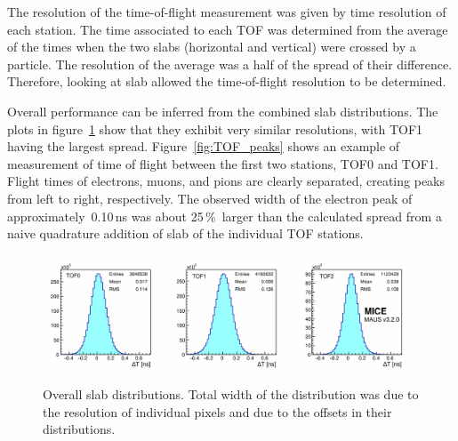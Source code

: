 The resolution of the time-of-flight measurement was given by time resolution
of each station.
The time associated to each TOF was determined from the average of the times when the two slabs (horizontal and vertical) were crossed by a particle.
The resolution of the average was a half of the spread of their difference. Therefore, looking at slab \DT{} allowed the time-of-flight
resolution to be determined.


Overall performance can be inferred from the combined slab \DT{}
distributions. The plots in figure~\ref{fig:SlabDtAll} show that
they
exhibit very similar resolutions, with TOF1 having the largest spread.
Figure~\ref{fig:TOF_peaks} shows an example of measurement of time of
flight between the first two stations, TOF0 and TOF1. Flight times of electrons,
muons, and pions are clearly separated, creating peaks from left to
right, respectively. The observed width of the electron peak of
approximately~0.10\,ns was about 25\,\%~larger than the calculated spread from a
naive quadrature addition of slab \DT{} of the individual TOF stations.

\begin{figure}[htb!]
  \begin{center}
  \includegraphics[width=0.9\columnwidth]{07_overall_slab_dt_edited} \\
  \caption{Overall slab \DT{} distributions. Total width of the
    distribution was due to the resolution of individual pixels and due to
    the offsets in their \DT{} distributions.}
  \label{fig:SlabDtAll}
  \end{center}
\end{figure}

